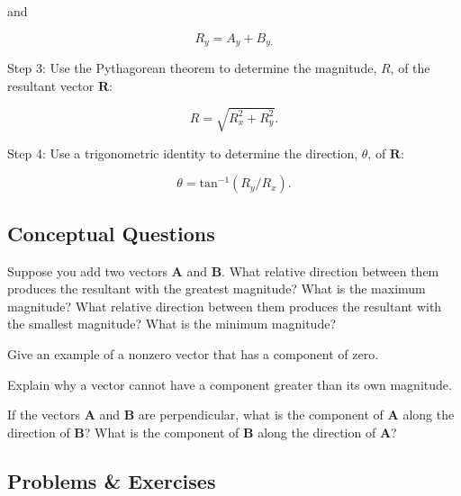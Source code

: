 \documentclass[
]{book}
\begin{document}
\begin{itemize}
  and

  \leavevmode{}%
  \[{R_{y} = {A_{y} + B_{y.}}}{}\]

  Step 3: Use the Pythagorean theorem to determine the magnitude,
  \(R{}\), of the resultant vector \(\textbf{R}{}\):

  \leavevmode{}%
  \[{R = \sqrt{R_{x}^{2} + R_{y}^{2}}}{}.\]

  Step 4: Use a trigonometric identity to determine the direction,
  \(\theta{}\), of \(\textbf{R}{}\):

  \leavevmode{}%
  \[{{\theta = \text{tan}^{- 1}}({R_{y}/R_{x}}).}{}\]
\end{itemize}

\hypertarget{fs-id1611286}{}
\hypertarget{conceptual-questions-8}{%
\subsection{Conceptual Questions}\label{conceptual-questions-8}}

\hypertarget{fs-id1611291}{}
\leavevmode{}%
Suppose you add two vectors \(\mathbf{A}{}\) and \(\mathbf{B}{}\). What
relative direction between them produces the resultant with the greatest
magnitude? What is the maximum magnitude? What relative direction
between them produces the resultant with the smallest magnitude? What is
the minimum magnitude?

\hypertarget{fs-id1611340}{}
\leavevmode{}%
Give an example of a nonzero vector that has a component of zero.

\hypertarget{fs-id1611347}{}
\leavevmode{}%
Explain why a vector cannot have a component greater than its own
magnitude.

\hypertarget{fs-id1611354}{}
\leavevmode{}%
If the vectors \(\mathbf{A}{}\) and \(\mathbf{B}{}\) are perpendicular, what
is the component of \(\mathbf{A}{}\) along the direction of
\(\mathbf{B}{}\)? What is the component of \(\mathbf{B}{}\) along the
direction of \(\mathbf{A}{}\)?

\hypertarget{eip-18}{}
\hypertarget{problems-exercises-7}{%
\subsection{Problems \& Exercises}\label{problems-exercises-7}}
\end{document}
